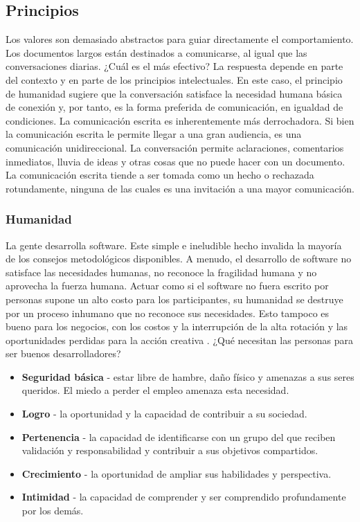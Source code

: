 \begin{spacing}{1.5}
	\subsection{Principios}
		Los valores son demasiado abstractos para guiar directamente el comportamiento. Los documentos largos están destinados a comunicarse, al igual que las conversaciones diarias. ¿Cuál es el más efectivo? La respuesta depende en parte del contexto y en parte de los principios intelectuales. En este caso, el principio de humanidad sugiere que la conversación satisface la necesidad humana básica de conexión y, por tanto, es la forma preferida de comunicación, en igualdad de condiciones. La comunicación escrita es inherentemente más derrochadora. Si bien la comunicación escrita le permite llegar a una gran audiencia, es una comunicación unidireccional. La conversación permite aclaraciones, comentarios inmediatos, lluvia de ideas y otras cosas que no puede hacer con un documento. La comunicación escrita tiende a ser tomada como un hecho o rechazada rotundamente, ninguna de las cuales es una invitación a una mayor comunicación.
		\subsubsection{Humanidad}
			La gente desarrolla software. Este simple e ineludible hecho invalida la mayoría de los consejos metodológicos disponibles. A menudo, el desarrollo de software no satisface las necesidades humanas, no reconoce la fragilidad humana y no aprovecha la fuerza humana. Actuar como si el software no fuera escrito por personas supone un alto costo para los participantes, su humanidad se destruye por un proceso inhumano que no reconoce sus necesidades. Esto tampoco es bueno para los negocios, con los costos y la interrupción de la alta rotación y las oportunidades perdidas para la acción creativa \cite{chap2_extreme_programming}.
			¿Qué necesitan las personas para ser buenos desarrolladores?
			\begin{itemize}
				\item\textbf{Seguridad básica} - estar libre de hambre, daño físico y amenazas a sus seres queridos. El miedo a perder el empleo amenaza esta necesidad.
				\item\textbf{Logro} - la oportunidad y la capacidad de contribuir a su sociedad.
				\item\textbf{Pertenencia} - la capacidad de identificarse con un grupo del que reciben validación y responsabilidad y contribuir a sus objetivos compartidos.
				\item\textbf{Crecimiento} - la oportunidad de ampliar sus habilidades y perspectiva.
				\item\textbf{Intimidad} - la capacidad de comprender y ser comprendido profundamente por los demás.
			\end{itemize}

\end{spacing}
